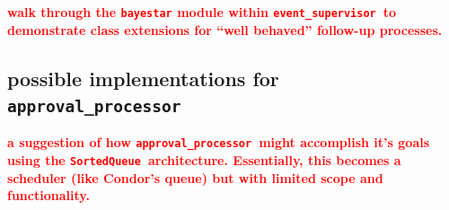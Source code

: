 \documentclass{article}
\newcommand{\FIXME}[1]{\textcolor{red}{\textbf{#1}}}
\newcommand{\SortedQueue}{\texttt{SortedQueue}~}
\newcommand{\approvalProcessor}{\texttt{approval\_processor}~}
\newcommand{\eventSupervisor}{\texttt{event\_supervisor}~}
\begin{document}
\FIXME{walk through the \texttt{bayestar} module within \eventSupervisor to demonstrate class extensions for ``well behaved'' follow-up processes.}


\subsection{possible implementations for \approvalProcessor}
\label{sec: approvalProcessor}

\FIXME{a suggestion of how \approvalProcessor might accomplish it's goals using the \SortedQueue architecture. Essentially, this becomes a scheduler (like Condor's queue) but with limited scope and functionality.}

\end{document}
